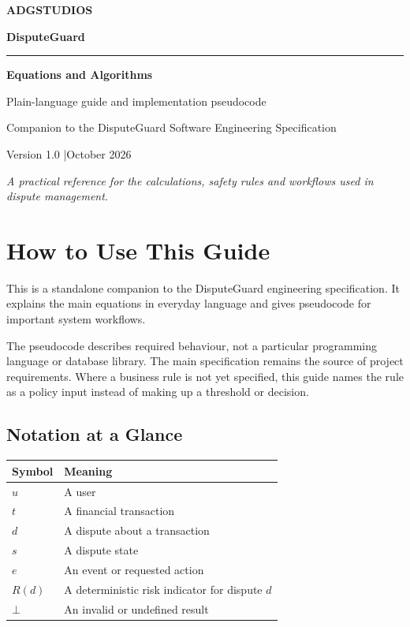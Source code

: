 \documentclass[11pt,a4paper]{article}
\begin{document}
\begin{titlepage}
    \centering
    \vspace*{2cm}
    {\Huge\bfseries ADGSTUDIOS\par}
    \vspace{0.5cm}
    {\LARGE\color{ADGBlue}\bfseries DisputeGuard\par}
    \vspace{1.5cm}
    \rule{0.85\textwidth}{0.8pt}
    \vspace{1cm}
    {\Large\bfseries Equations and Algorithms\par}
    \vspace{0.5cm}
    {\large Plain-language guide and implementation pseudocode\par}
    \vfill
    {\large Companion to the DisputeGuard Software Engineering Specification\par}
    \vspace{0.5cm}
    {\large Version 1.0 \quad|\quad October 2026\par}
    \vfill
    \textit{
        A practical reference for the calculations, safety rules and
        workflows used in dispute management.
    }
\end{titlepage}

\tableofcontents
\newpage

\section{How to Use This Guide}

This is a standalone companion to the DisputeGuard engineering
specification. It explains the main equations in everyday language and
gives pseudocode for important system workflows.

The pseudocode describes required behaviour, not a particular
programming language or database library. The main specification remains
the source of project requirements. Where a business rule is not yet
specified, this guide names the rule as a policy input instead of making
up a threshold or decision.

\subsection{Notation at a Glance}

\begin{center}
\begin{tabular}{@{}ll@{}}
\toprule
Symbol & Meaning \\
\midrule
\(u\) & A user \\
\(t\) & A financial transaction \\
\(d\) & A dispute about a transaction \\
\(s\) & A dispute state \\
\(e\) & An event or requested action \\
\(R(d)\) & A deterministic risk indicator for dispute \(d\) \\
\(\bot\) & An invalid or undefined result \\
\end{tabular}
\end{center}
\end{document}
